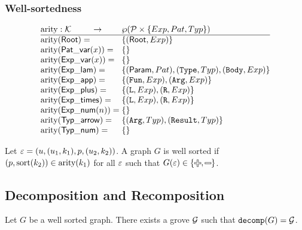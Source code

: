 
\subsubsection{Well-sortedness}

\[
  \arraycolsep=0pt
  \begin{array}{ll}
    \arity : \K \hfil \rightarrow & \wp(\P \times \{Exp, Pat, Typ\}) \\
    \hline
    \arity(\Root)={} & \left\{ (\Root, Exp) \right\} \\
    \arity(\PatVar(x))={} & \left\{ \right\} \\
    \arity(\ExpVar(x))={} & \left\{ \right\} \\
    \arity(\ExpLam)={} & \left\{ (\LamParam, Pat), (\mathtt{Type}, Typ), (\mathtt{Body}, Exp) \right\} \\
    \arity(\ExpApp)={} & \left\{ (\mathtt{Fun}, Exp), (\mathtt{Arg}, Exp) \right\} \\
    \arity(\ExpPlus)={} & \left\{ (\mathtt{L}, Exp), (\mathtt{R}, Exp) \right\} \\
    \arity(\ExpTimes)={} & \left\{ (\mathtt{L}, Exp), (\mathtt{R}, Exp) \right\} \\
    \arity(\ExpNum(n))={} & \left\{ \right\} \\
    \arity(\TypArrow)={} & \left\{ (\mathtt{Arg}, Typ), (\mathtt{Result}, Typ) \right\} \\
    \arity(\TypNum)={} & \left\{ \right\} \\
  \end{array}
\]

\begin{definition}
  Let $\varepsilon = (u, (u_1, k_1), p, (u_2, k_2))$.
  A graph $G$ is well sorted if $(p, \operatorname{\text{sort}}(k_2)) \in \operatorname{\text{arity}}(k_1)$
  for all $\varepsilon$ such that $G(\e) \in \{\Plus, \Minus\}$.
\end{definition}


\subsection{Decomposition and Recomposition}

\begin{theorem}
  Let $G$ be a well sorted graph.
  There exists a grove $\mathcal{G}$ such that $\operatorname{\texttt{decomp}}\mathopen{}\left(G\right)\mathclose{} = \mathcal{G}$.
\end{theorem}

